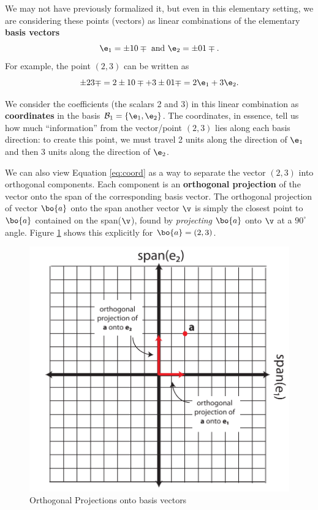 \documentclass[
]{article}
\theoremstyle{definition}
\theoremstyle{definition}
\theoremstyle{definition}
\theoremstyle{definition}
\theoremstyle{remark}
\begin{document}
We may not have previously formalized it, but even in this elementary setting, we are considering these points (vectors) as linear combinations of the elementary \textbf{basis vectors}
\[\e_1 = \pm 1\\0\mp \mbox{  and  } \e_2=\pm 0\\1 \mp.\]
For example, the point \((2,3)\) can be written as
\begin{equation}
\pm 2\\3 \mp = 2\pm 1\\0\mp+3\pm 0\\1\mp = 2\e_1+3\e_2.
  \label{eq:coord}
\end{equation}

We consider the coefficients (the scalars 2 and 3) in this linear combination as \textbf{coordinates} in the basis \(\mathcal{B}_1=\{\e_1,\e_2\}\). The coordinates, in essence, tell us how much ``information'' from the vector/point \((2 ,3 )\) lies along each basis direction: to create this point, we must travel 2 units along the direction of \(\e_1\) and then 3 units along the direction of \(\e_2\).

We can also view Equation \eqref{eq:coord} as a way to separate the vector \((2,3)\) into orthogonal components. Each component is an \textbf{orthogonal projection} of the vector onto the span of the corresponding basis vector. The orthogonal projection of vector \(\bo{a}\) onto the span another vector \(\v\) is simply the closest point to \(\bo{a}\) contained on the span(\(\v\)), found by \emph{projecting} \(\bo{a}\) onto \(\v\) at a \(90^\circ\) angle. Figure \ref{fig:orthogproj} shows this explicitly for \(\bo{a}=(2,3)\).

\begin{figure}

{\centering \includegraphics[width=0.4\linewidth]{figs/orthogproj} 

}

\caption{Orthogonal Projections onto basis vectors}\label{fig:orthogproj}
\end{figure}
\end{document}
